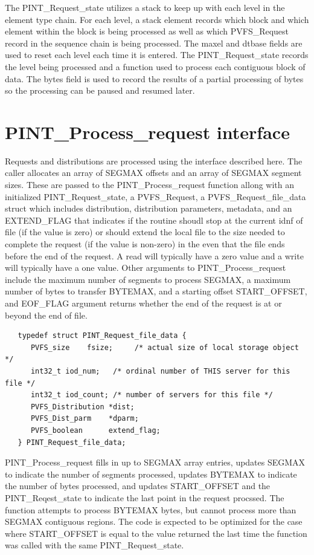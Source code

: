 \documentclass[12pt]{article} %
\begin{document}
The PINT\_Request\_state utilizes a stack to keep up with each level in the
element type chain.  For each level, a stack element records which block
and which element within the block is being processed as well as which
PVFS\_Request record in the sequence chain is being processed.  The
maxel and dtbase fields are used to reset each level each time it is
entered.  The PINT\_Request\_state records the level being processed
and a function used to process each contiguous block of data.  The bytes
field is used to record the results of a partial processing of bytes so
the processing can be paused and resumed later.

\section{PINT\_Process\_request interface}

Requests and distributions are processed using the interface described
here.  The caller allocates an array of SEGMAX offsets and an array of
SEGMAX segment sizes.  These are passed to the PINT\_Process\_request function
allong with an initialized PINT\_Request\_state, a PVFS\_Request, a
PVFS\_Request\_file\_data struct which includes distribution, distribution
parameters, metadata, and an EXTEND\_FLAG that indicates if the routine
shoudl stop at the current idnf of file (if the value is zero) or should
extend the local file to the size needed to complete the request (if the
value is non-zero) in the even that the file ends before the end of the
request. A read will typically have a zero value and a write will
typically have a one value.  Other arguments to PINT\_Process\_request
include the maximum number of segments to process SEGMAX,
a maximum number of bytes to transfer BYTEMAX,
and a starting offset START\_OFFSET, and EOF\_FLAG argument returns
whether the end of the request is at or beyond the end of file.

\begin{verbatim}
   typedef struct PINT_Request_file_data {
      PVFS_size    fsize;     /* actual size of local storage object */
      int32_t iod_num;   /* ordinal number of THIS server for this file */
      int32_t iod_count; /* number of servers for this file */
      PVFS_Distribution *dist;
      PVFS_Dist_parm    *dparm;
      PVFS_boolean      extend_flag;
   } PINT_Request_file_data;
\end{verbatim}

PINT\_Process\_request fills in up to SEGMAX array entries, updates
SEGMAX to indicate the number of segments processed, updates BYTEMAX
to indicate the number of bytes processed, and updates START\_OFFSET and the
PINT\_Reqest\_state to indicate the last point in the request procssed.
The function attempts to process BYTEMAX bytes, but cannot process more
than SEGMAX contiguous regions.  The code is expected to be optimized
for the case where START\_OFFSET is equal to the value returned the last time
the function was called with the same PINT\_Request\_state.
\end{document}
